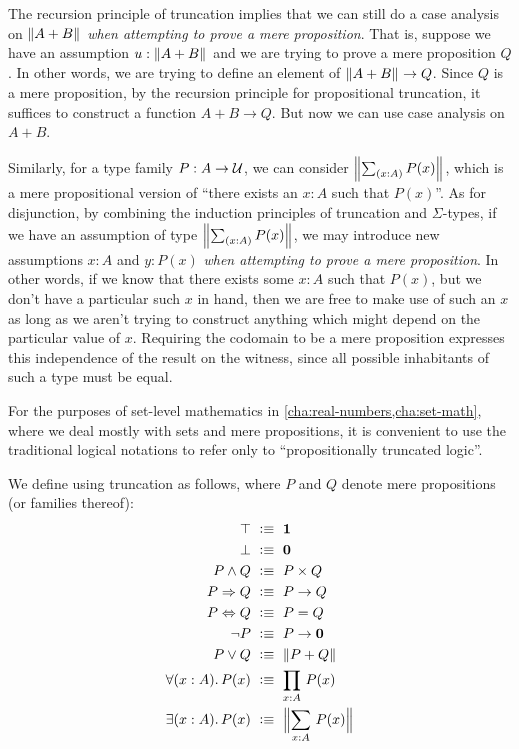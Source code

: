 The recursion principle of truncation implies that we can still do a case analysis on $\mathopen{}\left\Vert A+B\right\Vert_{}\mathclose{}$ \emph{when attempting to prove a mere proposition}.
That is, suppose we have an assumption $u:\mathopen{}\left\Vert A+B\right\Vert_{}\mathclose{}$ and we are trying to prove a mere proposition $Q$.
In other words, we are trying to define an element of $\mathopen{}\left\Vert A+B\right\Vert_{}\mathclose{} \to Q$.
Since $Q$ is a mere proposition, by the recursion principle for propositional truncation, it suffices to construct a function $A+B\to Q$.
But now we can use case analysis on $A+B$.

Similarly, for a type family $P:A\to\mathcal{U}$, we can consider $\brck{\sm{x:A} P(x)}$, which is a mere propositional version of ``there exists an $x:A$ such that $P(x)$''.
As for disjunction, by combining the induction principles of truncation and $\Sigma$-types, if we have an assumption of type $\brck{\sm{x:A} P(x)}$, we may introduce new assumptions $x:A$ and $y:P(x)$ \emph{when attempting to prove a mere proposition}.
In other words, if we know that there exists some $x:A$ such that $P(x)$, but we don't have a particular such $x$ in hand, then we are free to make use of such an $x$ as long as we aren't trying to construct anything which might depend on the particular value of $x$.
Requiring the codomain to be a mere proposition expresses this independence of the result on the witness, since all possible inhabitants of such a type must be equal.

For the purposes of set-level mathematics in \autoref{cha:real-numbers,cha:set-math},
where we deal mostly with sets and mere propositions, it is convenient to use the
traditional logical notations to refer only to ``propositionally truncated logic''.

\begin{defn} \label{defn:logical-notation}
  We define 
  using truncation as follows, where $P$ and $Q$ denote mere propositions (or families thereof):
  {\allowdisplaybreaks
  \begin{align*}
    \top            &\ \defeq \ \unit \\
    \bot            &\ \defeq \ \emptyt \\
    P \land Q       &\ \defeq \ P \times Q \\
    P \Rightarrow Q &\ \defeq \ P \to Q \\
    P \Leftrightarrow Q &\ \defeq \ P = Q \\
    \neg P          &\ \defeq \ P \to \emptyt \\
    P \lor Q        &\ \defeq \ \brck{P + Q} \\
    \fall{x : A} P(x) &\ \defeq \ \prd{x : A} P(x) \\
    \exis{x : A} P(x) &\ \defeq \ \Brck{\sm{x : A} P(x)}
  \end{align*}}
\end{defn}

